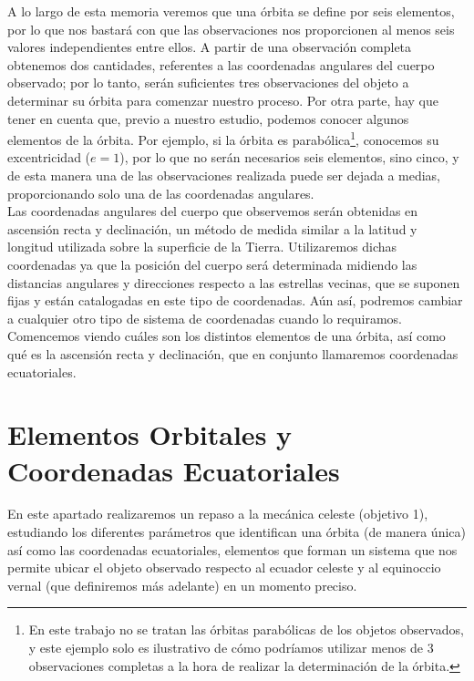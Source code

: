 A lo largo de esta memoria veremos que una órbita se define por seis elementos, por lo que nos bastará con que las observaciones nos proporcionen al menos seis valores independientes entre ellos. A partir de una observación completa obtenemos dos cantidades, referentes a las coordenadas angulares del cuerpo observado; por lo tanto, serán suficientes tres observaciones del objeto a determinar su órbita para comenzar nuestro proceso. Por otra parte, hay que tener en cuenta que, previo a nuestro estudio, podemos conocer algunos elementos de la órbita. Por ejemplo, si la órbita es parabólica\footnote{En este trabajo no se tratan las órbitas parabólicas de los objetos observados, y este ejemplo solo es ilustrativo de cómo podríamos utilizar menos de 3 observaciones completas a la hora de realizar la determinación de la órbita.}, conocemos su excentricidad ($e=1$), por lo que no serán necesarios seis elementos, sino cinco, y de esta manera una de las observaciones realizada puede ser dejada a medias, proporcionando solo una de las coordenadas angulares.\\

Las coordenadas angulares del cuerpo que observemos serán obtenidas en ascensión recta y declinación, un método de medida similar a la latitud y longitud utilizada sobre la superficie de la Tierra. Utilizaremos dichas coordenadas ya que la posición del cuerpo será determinada midiendo las distancias angulares y direcciones respecto a las estrellas vecinas, que se suponen fijas y están catalogadas en este tipo de coordenadas. Aún así, podremos cambiar a cualquier otro tipo de sistema de coordenadas cuando lo requiramos.\\

Comencemos viendo cuáles son los distintos elementos de una órbita, así como qué es la ascensión recta y declinación, que en conjunto llamaremos coordenadas ecuatoriales.\\





\section{Elementos Orbitales y Coordenadas Ecuatoriales}
\label{sec:orbital_elements_equatorial_coordinates}
En este apartado realizaremos un repaso a la mecánica celeste (objetivo 1), estudiando los diferentes parámetros que identifican una órbita (de manera única) así como las coordenadas ecuatoriales, elementos que forman un sistema que nos permite ubicar el objeto observado respecto al ecuador celeste y al equinoccio vernal (que definiremos más adelante) en un momento preciso.\\

